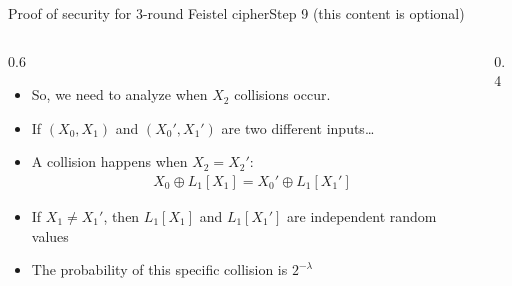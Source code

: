 \ifdefined\PRESENTATION\else\PassOptionsToClass{handout}{beamer}\fi\documentclass[aspectratio=169, lualatex]{beamer}
\begin{document}
	\begin{frame}{Proof of security for 3-round Feistel cipher}{Step 9 (this content is optional)}
		\begin{columns}[c]
			\begin{column}{0.6\textwidth}
				\begin{itemize}
					\item So, we need to analyze when $X_2$ collisions occur.
					\item If $(X_0, X_1)$ and $(X_0', X_1')$ are two different inputs\ldots
					\item A collision happens when $X_2 = X_2'$:
					      \begin{align*}
						      X_0 \oplus L_1[X_1] = X_0' \oplus L_1[X_1']
					      \end{align*}
					\item If $X_1 \neq X_1'$, then $L_1[X_1]$ and $L_1[X_1']$ are independent random values
					\item The probability of this specific collision is $2^{-\lambda}$
				\end{itemize}
			\end{column}
			\begin{column}{0.4\textwidth}
				\vspace{-1.5cm}
				\begin{center}
				\end{center}
			\end{column}
		\end{columns}
	\end{frame}
\end{document}
